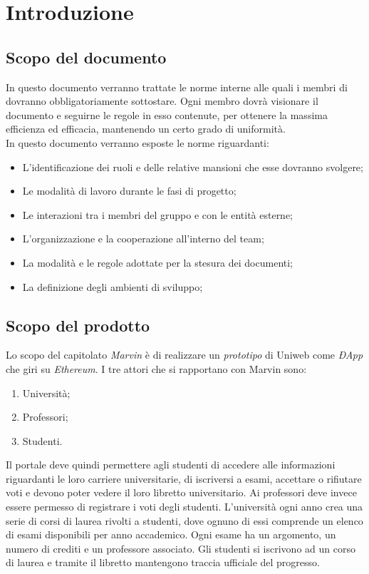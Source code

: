 \newpage
\section{Introduzione}

\subsection{Scopo del documento}
In questo documento verranno trattate le norme interne alle quali i membri di \gruppo{} dovranno obbligatoriamente sottostare. Ogni membro dovrà visionare il documento e seguirne le regole in esso contenute, per ottenere la massima efficienza ed efficacia, mantenendo un certo grado di uniformità.
\\In questo documento verranno esposte le norme riguardanti:
\begin{itemize}
	\item L'identificazione dei ruoli e delle relative mansioni che esse dovranno svolgere;
	\item Le modalità di lavoro durante le fasi di progetto;
	\item Le interazioni tra i membri del gruppo e con le entità esterne;
	\item L'organizzazione e la cooperazione all'interno del team;
	\item La modalità e le regole adottate per la stesura dei documenti;
	\item La definizione degli ambienti di sviluppo;
\end{itemize}
\subsection{Scopo del prodotto}
Lo scopo del capitolato \emph{Marvin} è di realizzare un \textit{prototipo} di Uniweb come \textit{ÐApp} che giri su \textit{Ethereum}. I tre attori che si rapportano con Marvin sono:
\begin{enumerate}
	\item Università;
	\item Professori;
	\item Studenti.
\end{enumerate}
Il portale deve quindi permettere agli studenti di accedere alle informazioni riguardanti le loro carriere universitarie, di iscriversi a esami, accettare o rifiutare voti e devono poter vedere il loro libretto universitario.
Ai professori deve invece essere permesso di registrare i voti degli studenti.
L'università ogni anno crea una serie di corsi di laurea rivolti a studenti, dove  ognuno di essi comprende un elenco di esami disponibili per anno accademico. Ogni esame ha un argomento, un numero di crediti e un professore associato. Gli studenti si iscrivono ad un corso di laurea e tramite il libretto mantengono traccia ufficiale del progresso.
